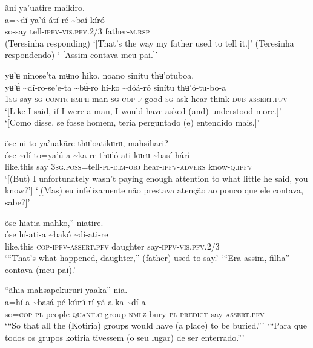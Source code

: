 \documentclass[output=paper,
modfonts,nonflat
]{langsci/langscibook}
\begin{document}
\ea ãni ya'uatire maikiro.  \\[.3em]
\gll {\textasciitilde}a={\textasciitilde}dí	ya'ú-átí-ré	{\textasciitilde}baí-kíró \\
     so-say	tell-\textsc{ipfv-vis.pfv.}2/3	father-\textsc{m.rsp}\\
\glt (Teresinha responding) ‘[That's the way my father used to tell it.]’ 
\glt (Teresinha respondendo) ‘ [Assim contava meu pai.]’
\z

\ea yʉ’ʉ ninose'ta mʉno hiko, noano sinitu thʉ'otuboa. \\[.3em]
\gll yʉ’ʉ́	{\textasciitilde}dí-ro-se'e-ta	{\textasciitilde}bʉ́-ro	hí-ko	{\textasciitilde}dóá-ró	sinítu	thʉ'ó-tu-bo-a \\
     1\textsc{sg}	say\textsc{-sg-contr-emph}	man\textsc{-sg}	\textsc{cop-f}	good\textsc{-sg}	ask	hear-think-\textsc{dub-assert.pfv}\\
\glt ‘[Like I said, if I were a man, I would have asked (and) understood more.{\footnotemark}]’
\glt ‘[Como disse, se fosse homem, teria perguntado (e) entendido mais.]’
\z 

\largerpage[2]
\ea õse ni to ya'uakãre thʉ'oatikʉrʉ, mahsihari? \\[.3em]
\gll {\textasciitilde}óse	{\textasciitilde}dí	to=ya'ú-a-{\textasciitilde}ka-re	thʉ'ó-ati-kʉrʉ	{\textasciitilde}basí-hárí \\
     like.this	say	3\textsc{sg.poss}=tell\textsc{-pl-dim-obj}	hear-\textsc{ipfv-advers}	know-\textsc{q.ipfv}\\
\glt ‘[(But) I unfortunately wasn’t paying enough attention to what little he said, you know?’]
\newpage
\glt ‘[(Mas) eu infelizamente não prestava atenção ao pouco que ele contava, sabe?]’
\z 

\ea õse hiatia mahko,” niatire.  \\[.3em]
\gll {\textasciitilde}óse	hí-ati-a	{\textasciitilde}bakó	{\textasciitilde}dí-ati-re \\
     like.this	\textsc{cop-ipfv-assert.pfv}	daughter	say-\textsc{ipfv-vis.pfv.}2/3\\
\glt ‘“That's what happened, daughter,” (father) used to say.’
\glt ‘“Era assim, filha” contava (meu pai).’ 
\z 

\ea “ãhia mahsapekururi yaaka” nia.\\[.3em]
\gll {\textasciitilde}a=hí-a	{\textasciitilde}basá-pé-kúrú-rí	yá-a-ka	{\textasciitilde}dí-a\\
so=\textsc{cop-pl}	people-\textsc{quant.c}-group\textsc{-nmlz}	bury\textsc{-pl-predict} say-\textsc{assert.pfv}\\
\glt ‘“So that all the (Kotiria) groups would have (a place) to be buried.”’
\glt ‘“Para que todos os grupos kotiria tivessem (o seu lugar) de ser enterrado.”’
\z 
\end{document}
